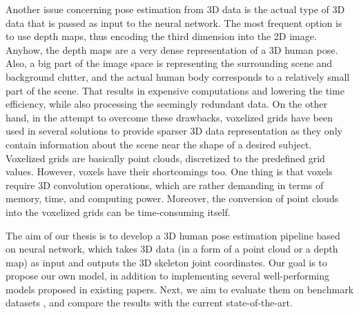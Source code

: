 \vspace{5mm}
\noindent Another issue concerning pose estimation from 3D data is the actual type of 3D data that is passed as input to the neural network. The most frequent option is to use depth maps, thus encoding the third dimension into the 2D image. Anyhow, the depth maps are a very dense representation of a 3D human pose. Also, a big part of the image space is representing the surrounding scene and background clutter, and the actual human body corresponds to a relatively small part of the scene. That results in expensive computations and lowering the time efficiency, while also processing the seemingly redundant data. On the other hand, in the attempt to overcome these drawbacks, voxelized grids have been used in several solutions to provide sparser 3D data representation as they only contain information about the scene near the shape of a desired subject. Voxelized grids are basically point clouds, discretized to the predefined grid values. However, voxels have their shortcomings too. One thing is that voxels require 3D convolution operations, which are rather demanding in terms of memory, time, and computing power. Moreover, the conversion of point clouds into the voxelized grids can be time-consuming itself.\par
\vspace{5mm}
\noindent The aim of our thesis is to develop a 3D human pose estimation pipeline based on neural network, which takes 3D data (in a form of a point cloud or a depth map) as input and outputs the 3D skeleton joint coordinates. %
Our goal is to propose our own model, in addition to implementing several well-performing models proposed in existing papers. Next, we aim to evaluate them on %
benchmark datasets%
, and compare the results with the current state-of-the-art.\par